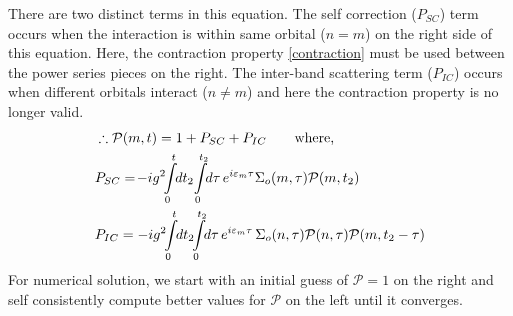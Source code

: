 \documentclass[%
 reprint,
 amsmath,amssymb,
 aps,prl,
floatfix
]{revtex4-2}
\begin{document}
There are two distinct terms in this equation. The self correction ($P_{SC}$) term occurs when the interaction is within same orbital ($n=m$) on the right side of this equation. Here, the contraction property \eqref{contraction} must be used between the power series pieces on the right. The inter-band scattering term ($P_{IC}$) occurs when different orbitals interact ($n\neq m$) and here the contraction property is no longer valid. 
\begin{equation}
    \begin{aligned}
    &\therefore \mathcal{P}(m,t) =  1 + P_{SC} + P_{IC}\quad \quad\text{where,}\\
    &P_{SC}=\! -ig^2\!\!\int\displaylimits_{0}^{t}\!\!dt_2 \!\int\displaylimits_{0}^{t_2}\!\!d{\tau}\, e^{i\varepsilon_{m}\tau}\Sigma_o(m,\tau)\mathcal{P}(m,t_2)\\
     &P_{IC}= -ig^2\!\!\int\displaylimits_{0}^{t}\!\!dt_2 \!\!\int\displaylimits_{0}^{t_2}\!\!d\tau\, e^{i\varepsilon_{m}\tau} \,\Sigma_o(n,\tau)\mathcal{P}(n,\tau)\mathcal{P}(m,t_2-\tau)\\
    \end{aligned}
    \label{Power_Corr_full}
\end{equation}
For numerical solution, we start with an initial guess of $\mathcal{P} = 1$ on the right and self consistently compute better values for $\mathcal{P}$ on the left until it converges. 
\end{document}
